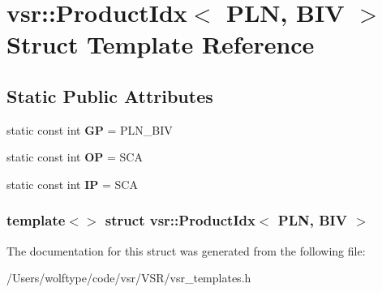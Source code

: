 \hypertarget{structvsr_1_1_product_idx_3_01_p_l_n_00_01_b_i_v_01_4}{\section{vsr\-:\-:Product\-Idx$<$ P\-L\-N, B\-I\-V $>$ Struct Template Reference}
\label{structvsr_1_1_product_idx_3_01_p_l_n_00_01_b_i_v_01_4}
}
\subsection*{Static Public Attributes}
\begin{DoxyCompactItemize}
\item 
\hypertarget{structvsr_1_1_product_idx_3_01_p_l_n_00_01_b_i_v_01_4_a8518bdced05738fbf007f7cb16e9fca7}{static const int {\bfseries G\-P} = P\-L\-N\-\_\-\-B\-I\-V}\label{structvsr_1_1_product_idx_3_01_p_l_n_00_01_b_i_v_01_4_a8518bdced05738fbf007f7cb16e9fca7}

\item 
\hypertarget{structvsr_1_1_product_idx_3_01_p_l_n_00_01_b_i_v_01_4_ac6469e303de063dd3bb6e94d9be29830}{static const int {\bfseries O\-P} = S\-C\-A}\label{structvsr_1_1_product_idx_3_01_p_l_n_00_01_b_i_v_01_4_ac6469e303de063dd3bb6e94d9be29830}

\item 
\hypertarget{structvsr_1_1_product_idx_3_01_p_l_n_00_01_b_i_v_01_4_acfad858e1fa5c69a209caf69224ea36f}{static const int {\bfseries I\-P} = S\-C\-A}\label{structvsr_1_1_product_idx_3_01_p_l_n_00_01_b_i_v_01_4_acfad858e1fa5c69a209caf69224ea36f}

\end{DoxyCompactItemize}
\subsubsection*{template$<$$>$ struct vsr\-::\-Product\-Idx$<$ P\-L\-N, B\-I\-V $>$}



The documentation for this struct was generated from the following file\-:\begin{DoxyCompactItemize}
\item 
/\-Users/wolftype/code/vsr/\-V\-S\-R/vsr\-\_\-templates.\-h\end{DoxyCompactItemize}
